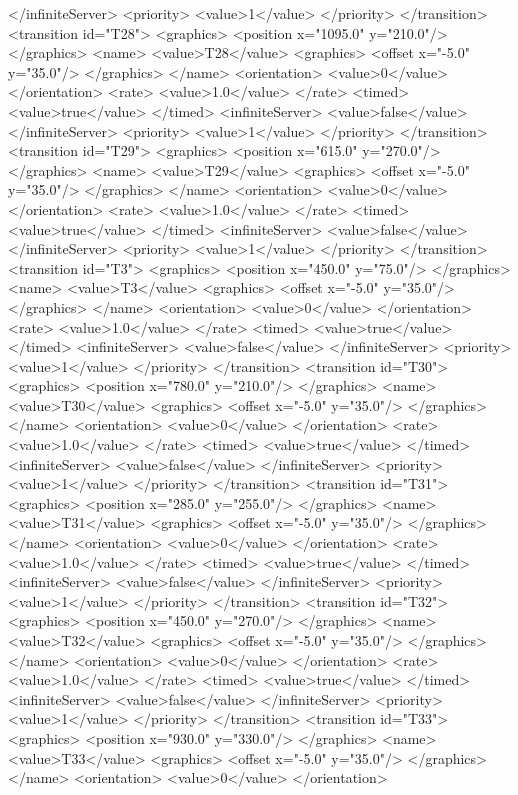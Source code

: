 </infiniteServer>
<priority>
<value>1</value>
</priority>
</transition>
<transition id="T28">
<graphics>
<position x="1095.0" y="210.0"/>
</graphics>
<name>
<value>T28</value>
<graphics>
<offset x="-5.0" y="35.0"/>
</graphics>
</name>
<orientation>
<value>0</value>
</orientation>
<rate>
<value>1.0</value>
</rate>
<timed>
<value>true</value>
</timed>
<infiniteServer>
<value>false</value>
</infiniteServer>
<priority>
<value>1</value>
</priority>
</transition>
<transition id="T29">
<graphics>
<position x="615.0" y="270.0"/>
</graphics>
<name>
<value>T29</value>
<graphics>
<offset x="-5.0" y="35.0"/>
</graphics>
</name>
<orientation>
<value>0</value>
</orientation>
<rate>
<value>1.0</value>
</rate>
<timed>
<value>true</value>
</timed>
<infiniteServer>
<value>false</value>
</infiniteServer>
<priority>
<value>1</value>
</priority>
</transition>
<transition id="T3">
<graphics>
<position x="450.0" y="75.0"/>
</graphics>
<name>
<value>T3</value>
<graphics>
<offset x="-5.0" y="35.0"/>
</graphics>
</name>
<orientation>
<value>0</value>
</orientation>
<rate>
<value>1.0</value>
</rate>
<timed>
<value>true</value>
</timed>
<infiniteServer>
<value>false</value>
</infiniteServer>
<priority>
<value>1</value>
</priority>
</transition>
<transition id="T30">
<graphics>
<position x="780.0" y="210.0"/>
</graphics>
<name>
<value>T30</value>
<graphics>
<offset x="-5.0" y="35.0"/>
</graphics>
</name>
<orientation>
<value>0</value>
</orientation>
<rate>
<value>1.0</value>
</rate>
<timed>
<value>true</value>
</timed>
<infiniteServer>
<value>false</value>
</infiniteServer>
<priority>
<value>1</value>
</priority>
</transition>
<transition id="T31">
<graphics>
<position x="285.0" y="255.0"/>
</graphics>
<name>
<value>T31</value>
<graphics>
<offset x="-5.0" y="35.0"/>
</graphics>
</name>
<orientation>
<value>0</value>
</orientation>
<rate>
<value>1.0</value>
</rate>
<timed>
<value>true</value>
</timed>
<infiniteServer>
<value>false</value>
</infiniteServer>
<priority>
<value>1</value>
</priority>
</transition>
<transition id="T32">
<graphics>
<position x="450.0" y="270.0"/>
</graphics>
<name>
<value>T32</value>
<graphics>
<offset x="-5.0" y="35.0"/>
</graphics>
</name>
<orientation>
<value>0</value>
</orientation>
<rate>
<value>1.0</value>
</rate>
<timed>
<value>true</value>
</timed>
<infiniteServer>
<value>false</value>
</infiniteServer>
<priority>
<value>1</value>
</priority>
</transition>
<transition id="T33">
<graphics>
<position x="930.0" y="330.0"/>
</graphics>
<name>
<value>T33</value>
<graphics>
<offset x="-5.0" y="35.0"/>
</graphics>
</name>
<orientation>
<value>0</value>
</orientation>
